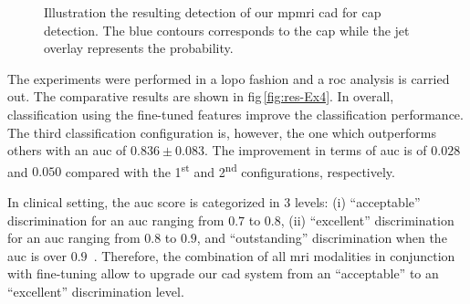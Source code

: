 \documentclass[conference]{sty/ieeeconf}
\begin{document}
\begin{figure}
  \hspace*{\fill}
 \hfill
 \hspace*{\fill}
  \caption[Illustration the resulting detection of our \acs*{mpmri}
  \acs*{cad} for \acs*{cap} detection.]{Illustration the resulting
    detection of our \acs*{mpmri} \acs*{cad} for \acs*{cap}
    detection. The blue contours corresponds to the \ac{cap} while the
    jet overlay represents the probability.}
  \label{fig:resultcad}
\end{figure}

The experiments were performed in a \ac{lopo} fashion and a \ac{roc}
analysis is carried out.
The comparative results are shown in \acs{fig}\,\ref{fig:res-Ex4}.
In overall, classification using the fine-tuned features improve the
classification performance.
The third classification configuration is, however, the one which
outperforms others with an \ac{auc} of $0.836 \pm 0.083$.
The improvement in terms of \ac{auc} is of $0.028$ and $0.050$
compared with the 1\textsuperscript{st} and 2\textsuperscript{nd}
configurations, respectively.

In clinical setting, the \ac{auc} score is categorized in 3 levels:
(i) ``acceptable'' discrimination for an \ac{auc} ranging from $0.7$
to $0.8$, (ii) ``excellent'' discrimination for an \ac{auc} ranging
from $0.8$ to $0.9$, and ``outstanding'' discrimination when the
\ac{auc} is over $0.9$~\cite{hosmer2004applied}.
Therefore, the combination of all \ac{mri} modalities in conjunction
with fine-tuning allow to upgrade our \ac{cad} system from an
``acceptable'' to an ``excellent'' discrimination level.
\end{document}
